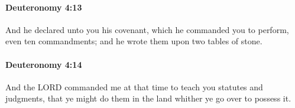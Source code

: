 		\paragraph{Deuteronomy 4:13} %
			\label{DEUTERONOMY-4-13}

			And he declared unto you his covenant, which he commanded you to perform, even ten commandments; and he wrote them upon two tables of stone.


		\paragraph{Deuteronomy 4:14} %
			\label{DEUTERONOMY-4-14}

			And the LORD commanded me at that time to teach you statutes and judgments, that ye might do them in the land whither ye go over to possess it.


